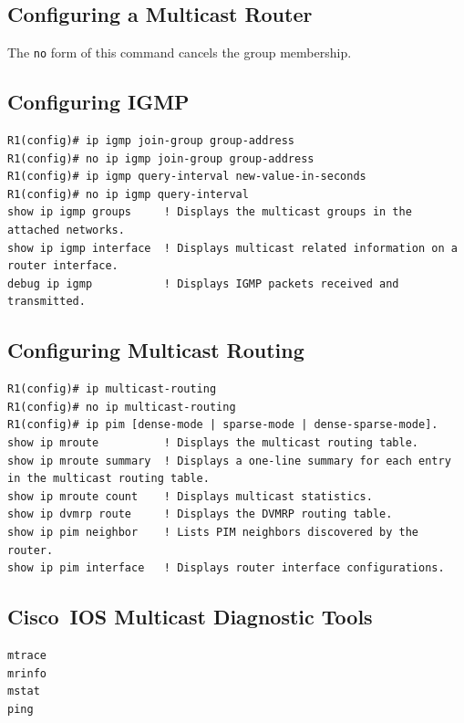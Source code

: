 \documentclass{../UTNetLab}
\begin{document}
\begin{appendices}

\section{Configuring a Multicast Router}
    The \lstinline[language={cisco}]{no} form of this command cancels the group membership.
    \begin{subappendices}
\subsection{Configuring IGMP}
    \begin{lstlisting}[language={cisco}, emph={group-address, new-value-in-seconds}]
R1(config)# ip igmp join-group group-address
R1(config)# no ip igmp join-group group-address
R1(config)# ip igmp query-interval new-value-in-seconds
R1(config)# no ip igmp query-interval
show ip igmp groups     ! Displays the multicast groups in the attached networks.
show ip igmp interface  ! Displays multicast related information on a router interface.
debug ip igmp           ! Displays IGMP packets received and transmitted.
    \end{lstlisting}

\subsection{Configuring Multicast Routing}
    \begin{lstlisting}[language={cisco}]
R1(config)# ip multicast-routing
R1(config)# no ip multicast-routing
R1(config)# ip pim [dense-mode | sparse-mode | dense-sparse-mode].
show ip mroute          ! Displays the multicast routing table.
show ip mroute summary  ! Displays a one-line summary for each entry in the multicast routing table.
show ip mroute count    ! Displays multicast statistics.
show ip dvmrp route     ! Displays the DVMRP routing table.
show ip pim neighbor    ! Lists PIM neighbors discovered by the router.
show ip pim interface   ! Displays router interface configurations.
    \end{lstlisting}

\subsection{Cisco~IOS Multicast Diagnostic Tools}
\begin{lstlisting}[language={cisco}]
mtrace
mrinfo
mstat
ping
\end{lstlisting}
    
    \end{subappendices}
\end{appendices}
\end{document}
